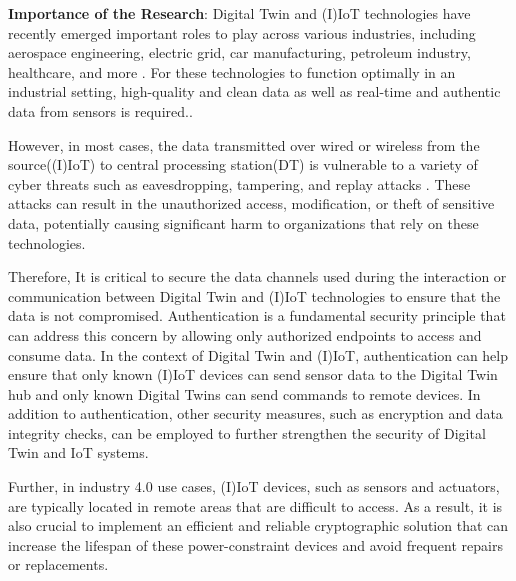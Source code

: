 \textbf{Importance of the Research}:
Digital Twin and (I)IoT technologies have recently emerged important roles to play across various industries, including aerospace engineering, electric grid, car manufacturing, petroleum industry, healthcare, and more \cite{tao_digital_2019}. For these technologies to function optimally in an industrial setting, high-quality and clean data \cite{fuller_digital_2020} as well as real-time and authentic data from sensors is required.\cite{yuchenziqianzhangningtangApplicationDigitalTwin2022}. 

 However, in most cases, the data transmitted over wired or wireless from the source((I)IoT) to central processing station(DT) is vulnerable to a variety of cyber threats such as eavesdropping, tampering, and replay attacks \cite{hussainiTaxonomySecurityDefense2022}. These attacks can result in the unauthorized access, modification, or theft of sensitive data, potentially causing significant harm to organizations that rely on these technologies.


Therefore, It is critical to secure the data channels used during the interaction or communication between Digital Twin and (I)IoT technologies to ensure that the data is not compromised. Authentication is a fundamental security principle that can address this concern by allowing only authorized endpoints to access and consume data. In the context of Digital Twin and (I)IoT, authentication can help ensure that only known (I)IoT devices can send sensor data to the Digital Twin hub and only known Digital Twins can send commands to remote devices. In addition to authentication, other security measures, such as encryption and data integrity checks, can be employed to further strengthen the security of Digital Twin and IoT systems.

Further, in industry 4.0 use cases, (I)IoT devices, such as sensors and actuators, are typically located in remote areas that are difficult to access. As a result, it is also crucial to implement an efficient and reliable cryptographic solution that can increase the lifespan of these power-constraint devices and avoid frequent repairs or replacements.  



